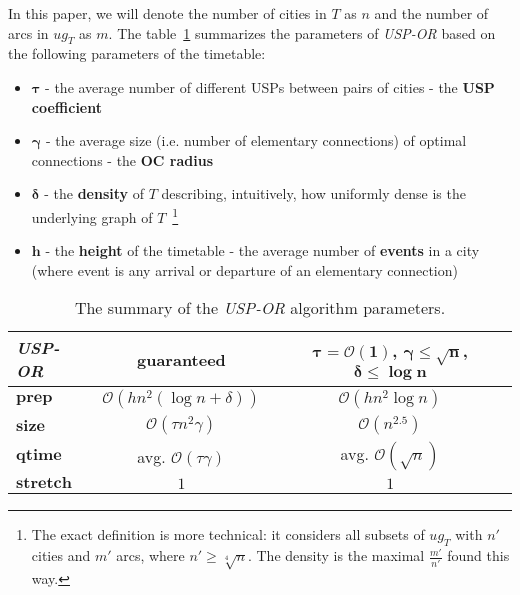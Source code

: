 \documentclass{svk_long_en}
\begin{document}
		In this paper, we will denote the number of cities in $T$ as $n$ and the number of arcs in $ug_{T}$ as $m$.
		The table~\ref{tab:uspor} summarizes the parameters of \textit{USP-OR} based on the following parameters of the timetable:
		\begin{itemize}
			\item $\bm{\tau}$ - the average number of different USPs between pairs of cities - the \textbf{USP coefficient}
			\item $\bm{\gamma}$ - the average size (i.e. number of elementary connections) of optimal connections - the \textbf{OC radius}
			\item $\bm{\delta}$ - the \textbf{density} of $T$ describing, intuitively, how uniformly dense is the underlying graph of $T$~\footnote{The exact definition is more technical: it considers all subsets of $ug_{T}$ with $n'$ cities and $m'$ arcs, where $n' \geq \sqrt[4]{n}$. The density is the maximal $\frac{m'}{n'}$ found this way.}
			\item $\bm{h}$ - the \textbf{height} of the timetable - the average number of \textbf{events} in a city (where event is any arrival or departure of an elementary connection)
		\end{itemize}
		
		\begin{table}[h!]
			\centering
			\small
			\begin{tabular}{l|c|c}
				\cellcolor{oracle-clr} \textit{\textbf{USP-OR}} & \cellcolor{oracle-clr} \textbf{guaranteed} & \cellcolor{oracle-clr} \parbox{1.8cm}{\textbf{$\bm{\tau = \mathcal{O}(1)}$,\\ $\bm{\gamma \leq \sqrt{n}}$,\\ $\bm{\delta \leq \log n}$}} \\ [2.75ex]
				\hline
				 $\bm{prep}$ & $\mathcal{O}(hn^{2} (\log n + \delta))$ & $\mathcal{O}(hn^{2} \log n)$ \\	
				 $\bm{size}$ & $\mathcal{O}(\tau n^{2} \gamma)$ & $\mathcal{O}(n^{2.5})$ \\
				 $\bm{qtime}$ & avg. $\mathcal{O}(\tau \gamma)$ & avg. $\mathcal{O}(\sqrt{n})$ \\
				 $\bm{stretch}$ & $1$ & $1$ \\
			\end{tabular}
			\caption{\label{tab:uspor} The summary of the \textit{USP-OR} algorithm parameters.}
		\end{table}
	
\end{document}
